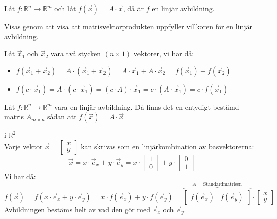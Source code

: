 \begin{sats}
    Låt $f: \mathbb{R}^n \rightarrow \mathbb{R}^m$ och låt $f(\vec{x}) = A \cdot \vec{x}$, då är $f$ en linjär avbildning.
\end{sats}
\noindent
Visas genom att visa att matrisvektorprodukten uppfyller villkoren för en linjär avbildning.
\begin{bevis}
Låt $\vec{x}_1$ och $\vec{x}_2$ vara två stycken $(n \times 1)$ vektorer, vi har då:
	\begin{itemize}
		\item $f(\vec{x}_1 + \vec{x}_2) = A \cdot (\vec{x}_1 + \vec{x}_2) = A \cdot \vec{x}_1 + A \cdot \vec{x}_2 = f(\vec{x}_1) + f(\vec{x}_2)$
		\item $f(c \cdot \vec{x}_1) = A \cdot (c \cdot \vec{x}_1) = (c \cdot A) \cdot \vec{x}_1 = c \cdot (A \cdot \vec{x}_1) = c \cdot f(\vec{x}_1)$
	\end{itemize}
\end{bevis}
\begin{sats}[Bassatsen]
    Låt $f: \mathbb{R}^n \rightarrow \mathbb{R}^m$ vara en linjär avbildning. Då finns det en entydigt bestämd matris $A_{m \times n}$ sådan att $f(\vec{x}) = A \cdot \vec{x}$
\end{sats}
\begin{bevis}
	i $\mathbb{R}^2$\\
	Varje vektor $\vec{x} = \begin{bmatrix} x\\y \end{bmatrix}$ kan skrivas som en linjärkombination av basvektorerna:
	\[
	   \vec{x} = x \cdot \vec{e}_x + y \cdot \vec{e}_y = x \cdot \begin{bmatrix} 1\\0 \end{bmatrix} + y \cdot \begin{bmatrix} 0\\1 \end{bmatrix}
	 \]
	 Vi har då:
	 \[
	     f(\vec{x}) = f(x \cdot \vec{e}_x + y \cdot \vec{e}_y) = x \cdot f(\vec{e}_x) + y \cdot f(\vec{e}_y) = \overbrace{\begin{bmatrix} f(\vec{e}_x)&f(\vec{e}_y) \end{bmatrix}}^\text{$A$ = Standardmatrisen} \cdot \begin{bmatrix} x\\y \end{bmatrix}
	 \]
	 Avbildningen bestäms helt av vad den gör med $\vec{e}_x$ och $\vec{e}_y$. 
\end{bevis}

